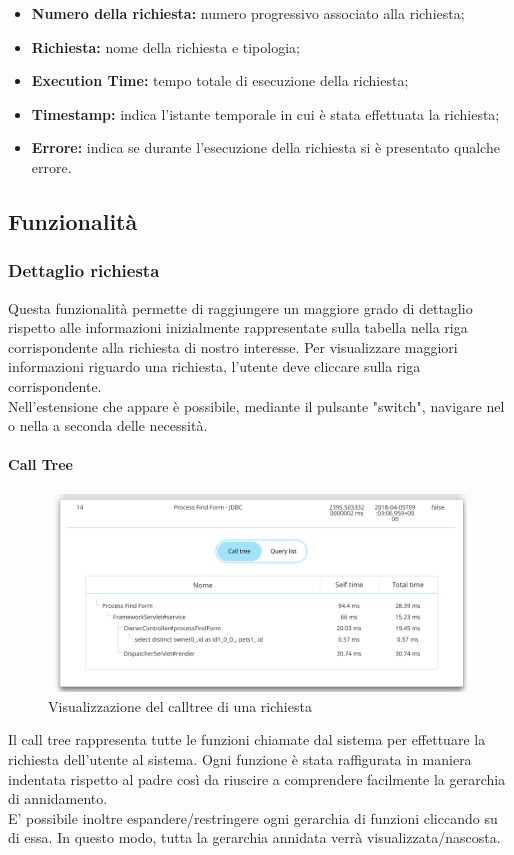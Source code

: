     \begin{itemize}
    	
    	\item \textbf{Numero della richiesta:} numero progressivo associato alla richiesta;
    	\item \textbf{Richiesta:} nome della richiesta e tipologia;
    	\item \textbf{Execution Time:} tempo totale di esecuzione della richiesta;
    	\item \textbf{Timestamp:} indica l'istante temporale in cui è stata effettuata la richiesta;
    	\item \textbf{Errore:} indica se durante l'esecuzione della richiesta si è presentato qualche errore.
    	
    	\end{itemize}

\subsection{Funzionalità}
\subsubsection {Dettaglio richiesta}
Questa funzionalità permette di raggiungere un maggiore grado di dettaglio rispetto alle informazioni inizialmente rappresentate sulla tabella nella riga corrispondente alla richiesta di nostro interesse.
Per visualizzare maggiori informazioni riguardo una richiesta, l'utente deve cliccare sulla riga corrispondente.
\\Nell'estensione che appare è possibile, mediante il pulsante "switch", navigare nel  o nella  a seconda delle necessità.

\paragraph {Call Tree} \Spazio
\begin{figure}[H]
	\centering 
	\includegraphics[width=1\textwidth]{Images/calltree}
	\caption{Visualizzazione del calltree di una richiesta}
\end{figure}
Il call tree rappresenta tutte le funzioni chiamate dal sistema per effettuare la richiesta dell'utente al sistema.
Ogni funzione è stata raffigurata in maniera indentata rispetto al padre così da riuscire a comprendere facilmente la gerarchia di annidamento.\\
E' possibile inoltre espandere/restringere ogni gerarchia di funzioni cliccando su di essa. In questo modo, tutta la gerarchia annidata verrà visualizzata/nascosta.

